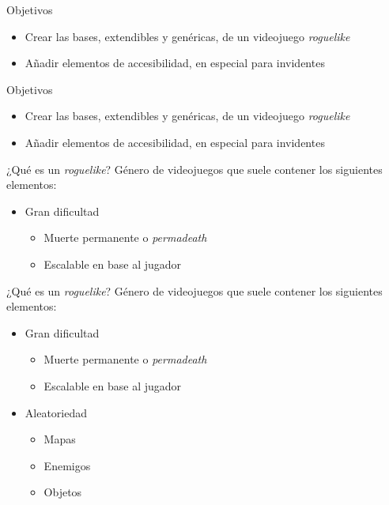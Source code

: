 \titlepageframe %


\begin{tframe}{Objetivos}
	\begin{itemize}
			\item Crear las bases, extendibles y genéricas, de un videojuego \textit{roguelike}
			\item Añadir elementos de accesibilidad, en especial para invidentes
	\end{itemize}
\end{tframe}


\begin{tframe}{Objetivos}
	\begin{itemize}
			\item<+-| alert@+> Crear las bases, extendibles y genéricas, de un videojuego \textit{roguelike}
			\item Añadir elementos de accesibilidad, en especial para invidentes
	\end{itemize}
\end{tframe}

\begin{tframe}{¿Qué es un \textit{roguelike}?}
	Género de videojuegos que suele contener los siguientes elementos:
	\begin{itemize}
		\item<+-| alert@+> Gran dificultad
			\begin{itemize}
				\item Muerte permanente o \textit{permadeath}
				\item Escalable en base al jugador
			\end{itemize}
	\end{itemize}
\end{tframe}

\begin{tframe}{¿Qué es un \textit{roguelike}?}
	Género de videojuegos que suele contener los siguientes elementos:
	\begin{itemize}
		\item Gran dificultad
			\begin{itemize}
				\item Muerte permanente o \textit{permadeath}
				\item Escalable en base al jugador
			\end{itemize}
		\item<+-| alert@+> Aleatoriedad
		\begin{itemize}
			\item Mapas
			\item Enemigos
			\item Objetos
		\end{itemize}
	\end{itemize}
\end{tframe}

